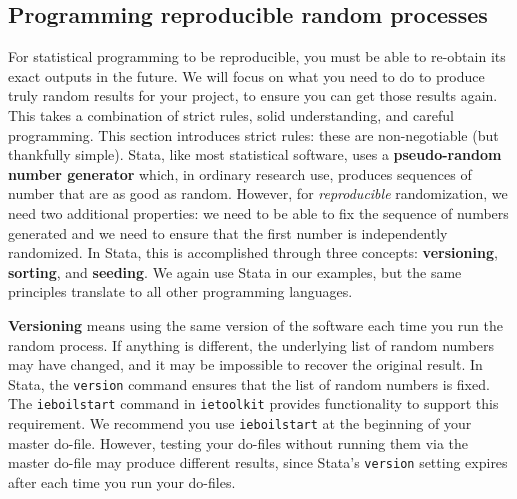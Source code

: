 

\subsection{Programming reproducible random processes}

For statistical programming to be reproducible,
you must be able to re-obtain its exact outputs in the future.\cite{orozco2018make}
We will focus on what you need to do to produce
truly random results for your project,
to ensure you can get those results again.
This takes a combination of strict rules, solid understanding, and careful programming.
This section introduces strict rules:
these are non-negotiable (but thankfully simple).
Stata, like most statistical software, uses a \textbf{pseudo-random number generator}
which, in ordinary research use,
produces sequences of number that are as good as random.
However, for \textit{reproducible} randomization, we need two additional properties:
we need to be able to fix the sequence of numbers generated and
we need to ensure that the first number is independently randomized.
In Stata, this is accomplished through three concepts:
\textbf{versioning}, \textbf{sorting}, and \textbf{seeding}.
We again use Stata in our examples,
but the same principles translate to all other programming languages.

\textbf{Versioning} means using the same version of the software each time you run the random process.
If anything is different, the underlying list of random numbers may have changed,
and it may be impossible to recover the original result.
In Stata, the \texttt{version} command ensures that the list of random numbers is fixed.
The \texttt{ieboilstart} command in \texttt{ietoolkit} provides functionality to support this requirement.
We recommend you use \texttt{ieboilstart} at the beginning of your master do-file.
However, testing your do-files without running them
via the master do-file may produce different results,
since Stata's \texttt{version} setting expires after each time you run your do-files.


